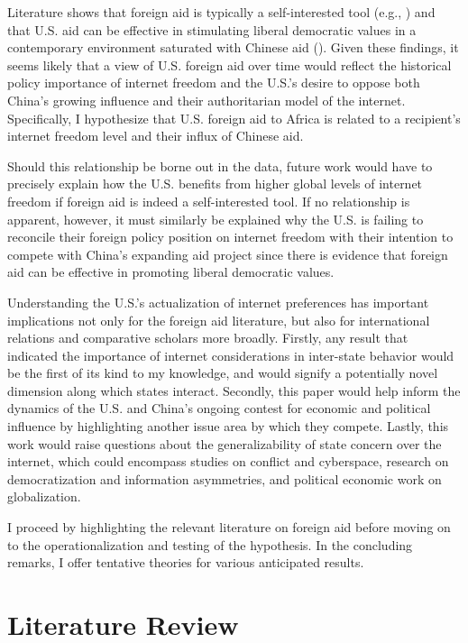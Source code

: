 \documentclass{article}
\begin{document}
Literature shows that foreign aid is typically a self-interested tool (e.g., \cite{hoeffler2011}) and that U.S. aid can be effective in stimulating liberal democratic values in a contemporary environment saturated with Chinese aid (\cite{blair2022}). Given these findings, it seems likely that a view of U.S. foreign aid over time would reflect the historical policy importance of internet freedom and the U.S.'s desire to oppose both China's growing influence and their authoritarian model of the internet. Specifically, I hypothesize that U.S. foreign aid to Africa is related to a recipient's internet freedom level and their influx of Chinese aid.

Should this relationship be borne out in the data, future work would have to precisely explain how the U.S. benefits from higher global levels of internet freedom if foreign aid is indeed a self-interested tool. If no relationship is apparent, however, it must similarly be explained why the U.S. is failing to reconcile their foreign policy position on internet freedom with their intention to compete with China's expanding aid project since there is evidence that foreign aid can be effective in promoting liberal democratic values.

Understanding the U.S.'s actualization of internet preferences has important implications not only for the foreign aid literature, but also for international relations and comparative scholars more broadly. Firstly, any result that indicated the importance of internet considerations in inter-state behavior would be the first of its kind to my knowledge, and would signify a potentially novel dimension along which states interact. Secondly, this paper would help inform the dynamics of the U.S. and China's ongoing contest for economic and political influence by highlighting another issue area by which they compete. Lastly, this work would raise questions about the generalizability of state concern over the internet, which could encompass studies on conflict and cyberspace, research on democratization and information asymmetries, and political economic work on globalization.

I proceed by highlighting the relevant literature on foreign aid before moving on to the operationalization and testing of the hypothesis. In the concluding remarks, I offer tentative theories for various anticipated results.  

\section*{Literature Review}
\end{document}
